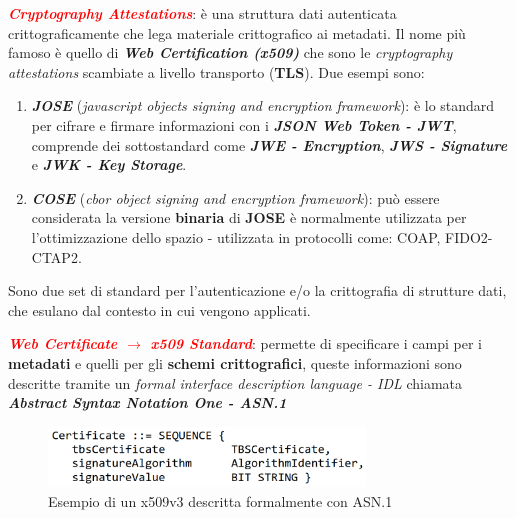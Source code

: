 \begin{flushleft}
    \medskip

    \textcolor{red}{\textbf{\textit{Cryptography Attestations}}}: è una struttura dati autenticata crittograficamente che lega materiale crittografico ai metadati. Il nome più famoso è quello di \textbf{\textit{Web Certification (x509)}} che sono le \textit{cryptography attestations} scambiate a livello transporto (\textbf{TLS}). Due esempi sono:
    \begin{enumerate}[nosep]
        \item \textbf{\textit{JOSE}} (\textit{javascript objects signing and encryption framework}): è lo standard per cifrare e firmare informazioni con i \textbf{\textit{JSON Web Token - JWT}}, comprende dei sottostandard come \textbf{\textit{JWE - Encryption}}, \textbf{\textit{JWS - Signature}} e \textbf{\textit{JWK - Key Storage}}.
        \item \textbf{\textit{COSE}} (\textit{cbor object signing and encryption framework}): può essere considerata la versione \textbf{binaria} di \textbf{JOSE} è normalmente utilizzata per l'ottimizzazione dello spazio - utilizzata in protocolli come: COAP, FIDO2-CTAP2.
    \end{enumerate}
    Sono due set di standard per l'autenticazione e/o la crittografia di strutture dati, che esulano dal contesto in cui vengono applicati.

    \medskip

    \textcolor{red}{\textbf{\textit{Web Certificate $\rightarrow$ x509 Standard}}}: permette di specificare i campi per i \textbf{metadati} e quelli per gli \textbf{schemi crittografici}, queste informazioni sono descritte tramite un \textit{formal interface description language - IDL} chiamata \textbf{\textit{Abstract Syntax Notation One - ASN.1}}

    \begin{figure}[h]
        \centering
        \includegraphics[width=0.75\textwidth]{img/x509.png}
        \caption{Esempio di un x509v3 descritta formalmente con ASN.1}
    \end{figure}


\end{flushleft}
